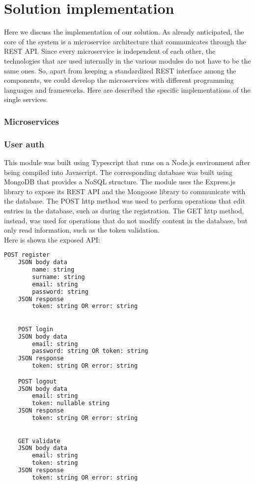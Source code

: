 \section{Solution implementation}
Here we discuss the implementation of our solution. As already anticipated,
the core of the system is a microservice architecture that communicates
through the REST API. Since every microservice is independent of each
other, the technologies that are used internally in the various modules
do not have to be the same ones. So, apart from keeping a standardized REST
interface among the components, we could develop the microservices with
different programming languages and frameworks. Here are described the
specific implementations of the single services.

\subsubsection{Microservices}


\subsubsection{User auth}

This module was built using Typescript that runs on a Node.js environment after
being compiled into Javascript. The corresponding database was built using MongoDB
that provides a NoSQL structure. The module uses the Express.js library to expose
its REST API and the Mongoose library to communicate with the database. The POST http
method was used to perform operations that edit entries in the database, such as
during the registration. The GET http method, instead, was used for operations that
do not modify content in the database, but only read information, such as the token
validation.\\

Here is shown the exposed API:\\


\begin{lstlisting}[language=bash,caption={User auth exposed API}]
    POST register
    JSON body data
        name: string
        surname: string
        email: string
        password: string
    JSON response
        token: string OR error: string

        
    POST login
    JSON body data
        email: string
        password: string OR token: string
    JSON response
        token: string OR error: string

    POST logout
    JSON body data
        email: string
        token: nullable string
    JSON response
        token: string OR error: string

        
    GET validate
    JSON body data
        email: string
        token: string
    JSON response
        token: string OR error: string
\end{lstlisting}


